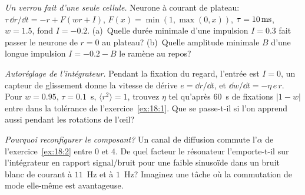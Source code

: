 \begin{exercise}[\lvlB]
\label{ex:18:5}
\emph{Un verrou fait d'une seule cellule.} Neurone à courant de plateau: $\tau\,\dd r/\dd t=-r+F(wr+I)$, $F(x)=\min(1,\max(0,x))$, $\tau=10\,\text{ms}$, $w=1.5$, fond $I=-0.2$. (a)~Quelle durée minimale d'une impulsion $I=0.3$ fait passer le neurone de $r=0$ au plateau? (b)~Quelle amplitude minimale $B$ d'une longue impulsion $I=-0.2-B$ le ramène au repos?
\end{exercise}

\begin{exercise}[\lvlB]
\label{ex:18:6}
\emph{Autoréglage de l'intégrateur.} Pendant la fixation du regard, l'entrée est $I=0$, un capteur de glissement donne la vitesse de dérive $e=\dd r/\dd t$, et $\dd w/\dd t=-\eta\,e\,r$. Pour $w=0.95$, $\tau=0.1$~s, $\langle r^2\rangle=1$, trouvez $\eta$ tel qu'après $60$~s de fixations $|1-w|$ entre dans la tolérance de l'exercice~\ref{ex:18:1}. Que se passe-t-il si l'on apprend aussi pendant les rotations de l'œil?
\end{exercise}

\begin{exercise}[\lvlC]
\label{ex:18:7}
\emph{Pourquoi reconfigurer le composant?} Un canal de diffusion commute l'$\alpha$ de l'exercice~\ref{ex:18:2} entre $0$ et $4$. De quel facteur le résonateur l'emporte-t-il sur l'intégrateur en rapport signal/bruit pour une faible sinusoïde dans un bruit blanc de courant à $11$~Hz et à $1$~Hz? Imaginez une tâche où la commutation de mode elle-même est avantageuse.
\end{exercise}
